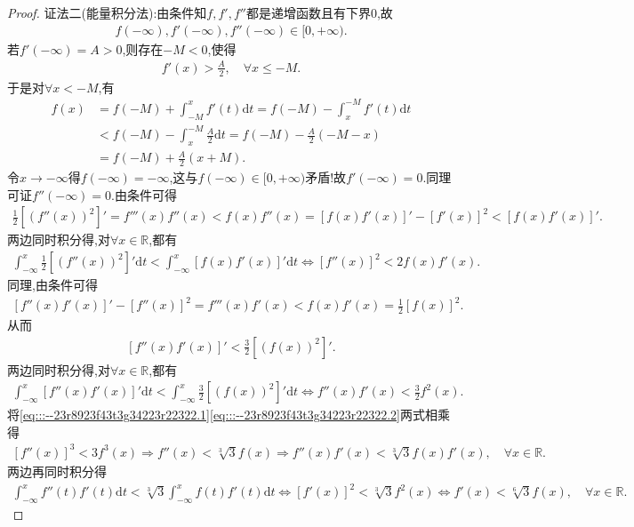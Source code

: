 \documentclass[../../main.tex]{subfiles}%
\begin{document}
\begin{proof}
{\color{blue}证法二(能量积分法):}由条件知$f,f',f''$都是递增函数且有下界$0$,故
\begin{align*}
f(-\infty),f'(-\infty),f''(-\infty)\in [0,+\infty).
\end{align*}
若$f'(-\infty)=A>0$,则存在$-M<0$,使得
\begin{align*}
f'(x)>\frac{A}{2},\quad \forall x\leqslant -M.
\end{align*}
于是对$\forall x<-M$,有
\begin{align*}
f\left( x \right) &=f\left( -M \right) +\int_{-M}^x{f' \left( t \right) \mathrm{d}t}=f\left( -M \right) -\int_x^{-M}{f' \left( t \right) \mathrm{d}t}
\\
&<f\left( -M \right) -\int_x^{-M}{\frac{A}{2}\mathrm{d}t}=f\left( -M \right) -\frac{A}{2}\left( -M-x \right) 
\\
&=f\left( -M \right) +\frac{A}{2}\left( x+M \right) .
\end{align*}
令$x\rightarrow -\infty$得$f(-\infty)=-\infty$,这与$f(-\infty)\in [0,+\infty)$矛盾!故$f'(-\infty)=0$.同理可证$f''(-\infty)=0$.由条件可得
\begin{align*}
\frac{1}{2}\left[ \left( f''(x) \right)^2 \right]'=f'''(x)f''(x)<f(x)f''(x)=\left[ f(x)f'(x) \right]'-\left[ f'(x) \right]^2<\left[ f(x)f'(x) \right]'.
\end{align*}
两边同时积分得,对$\forall x\in \mathbb{R}$,都有
\begin{align}
\int_{-\infty}^x \frac{1}{2}\left[ \left( f''(x) \right)^2 \right]'\mathrm{d}t<\int_{-\infty}^x \left[ f(x)f'(x) \right]'\mathrm{d}t\Longleftrightarrow \left[ f''(x) \right]^2<2f(x)f'(x). \label{eq:::--23r8923f43t3g34223r22322.1}
\end{align}
同理,由条件可得
\begin{align*}
\left[ f''(x)f'(x) \right]'-\left[ f''(x) \right]^2=f'''(x)f'(x)<f(x)f'(x)=\frac{1}{2}\left[ f(x) \right]^2.
\end{align*}
从而
\begin{align*}
\left[ f''(x)f'(x) \right]'<\frac{3}{2}\left[ \left( f(x) \right)^2 \right]'.
\end{align*}
两边同时积分得,对$\forall x\in \mathbb{R}$,都有
\begin{align}
\int_{-\infty}^x \left[ f''(x)f'(x) \right]'\mathrm{d}t<\int_{-\infty}^x \frac{3}{2}\left[ \left( f(x) \right)^2 \right]'\mathrm{d}t\Longleftrightarrow f''(x)f'(x)<\frac{3}{2}f^2(x). \label{eq:::--23r8923f43t3g34223r22322.2}
\end{align}
将\eqref{eq:::--23r8923f43t3g34223r22322.1}\eqref{eq:::--23r8923f43t3g34223r22322.2}两式相乘得
\begin{align*}
\left[ f''(x) \right]^3<3f^3(x)\Longrightarrow f''(x)<\sqrt[3]{3}f(x)\Longrightarrow f''(x)f'(x)<\sqrt[3]{3}f(x)f'(x),\quad \forall x\in \mathbb{R}.
\end{align*}
两边再同时积分得
\begin{align*}
\int_{-\infty}^x f''(t)f'(t)\mathrm{d}t<\sqrt[3]{3}\int_{-\infty}^x f(t)f'(t)\mathrm{d}t\Longleftrightarrow \left[ f'(x) \right]^2<\sqrt[3]{3}f^2(x)\Longleftrightarrow f'(x)<\sqrt[6]{3}f(x),\quad \forall x\in \mathbb{R}.
\end{align*}
\end{proof}
\end{document}
